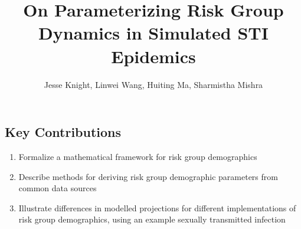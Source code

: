 \documentclass[10pt]{article}
\title{On Parameterizing Risk Group Dynamics in Simulated STI Epidemics}
\author{Jesse Knight, Linwei Wang, Huiting Ma, Sharmistha Mishra}
\numberwithin{equation}{section}
\begin{document}
\maketitle
\tableofcontents
\subsection*{Key Contributions}
\begin{enumerate}
  \item Formalize a mathematical framework for risk group demographics
  \item Describe methods for deriving risk group demographic parameters from common data sources
  \item Illustrate differences in modelled projections
  for different implementations of risk group demographics,
  using an example sexually transmitted infection
\end{enumerate}
\clearpage
\end{document}
